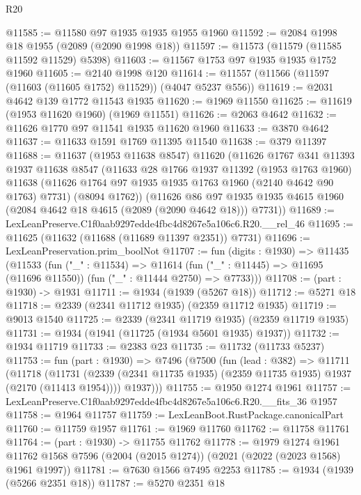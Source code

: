 \begin{lexlean}{R20}
\begin{coremodule}
@11585 := @11580 @97 @1935 @1935 @1955 @1960
@11592 := @2084 @1998 @18 @1955 (@2089 (@2090 @1998 @18))
@11597 := @11573 (@11579 (@11585 @11592 @11529) @5398)
@11603 := @11567 @1753 @97 @1935 @1935 @1752 @1960
@11605 := @2140 @1998 @120
@11614 := @11557 (@11566 (@11597 (@11603 (@11605 @1752) @11529)) (@4047 @5237 @556))
@11619 := @2031 @4642 @139 @1772 @11543 @1935
@11620 := @1969 @11550
@11625 := @11619 (@1953 @11620 @1960) (@1969 @11551)
@11626 := @2063 @4642
@11632 := @11626 @1770 @97 @11541 @1935 @11620 @1960
@11633 := @3870 @4642
@11637 := @11633 @1591 @1769 @11395 @11540
@11638 := @379 @11397
@11688 := @11637
    (@1953 @11638 @8547)
    @11620
    (@11626
      @1767
      @341
      @11393
      @1937
      @11638
      @8547
      (@11633
        @28
        @1766
        @1937
        @11392
        (@1953 @1763 @1960)
        @11638
        (@11626 @1764 @97 @1935 @1935 @1763 @1960 (@2140 @4642 @90 @1763) @7731)
        (@8094 @1762))
      (@11626
        @86
        @97
        @1935
        @1935
        @4615
        @1960
        (@2084 @4642 @18 @4615 (@2089 (@2090 @4642 @18)))
        @7731))
@11689 := LexLeanPreserve.C1f0aab9297edde4fbc4d8267e5a106c6.R20.__rel_46
@11695 := @11625 (@11632 (@11688 (@11689 @11397 @2351)) @7731)
@11696 := LexLeanPreservation.prim_boolNot
@11707 := fun (digits : @1930) =>
  @11435
    (@11533
      (fun ("_" : @11534) =>
      @11614 (fun ("_" : @11445) => @11695 (@11696 @11550)) (fun ("_" : @11444 @2750) => @7733)))
@11708 := (part : @1930) -> @1931
@11711 := @1934 (@1939 (@5267 @18))
@11712 := @5271 @18
@11718 := @2339 (@2341 @11712 @1935) (@2359 @11712 @1935)
@11719 := @9013 @1540
@11725 := @2339 (@2341 @11719 @1935) (@2359 @11719 @1935)
@11731 := @1934 (@1941 (@11725 (@1934 @5601 @1935) @1937))
@11732 := @1934 @11719
@11733 := @2383 @23
@11735 := @11732 (@11733 @5237)
@11753 := fun (part : @1930) =>
  @7496
    (@7500
      (fun (lead : @382) =>
      @11711
        (@11718
          (@11731 (@2339 (@2341 @11735 @1935) (@2359 @11735 @1935) @1937 (@2170 (@11413 @1954))))
          @1937)))
@11755 := @1950 @1274 @1961
@11757 := LexLeanPreserve.C1f0aab9297edde4fbc4d8267e5a106c6.R20.__fits_36 @1957
@11758 := @1964 @11757
@11759 := LexLeanBoot.RustPackage.canonicalPart
@11760 := @11759 @1957
@11761 := @1969 @11760
@11762 := @11758 @11761
@11764 := (part : @1930) -> @11755 @11762
@11778 := @1979
    @1274
    @1961
    @11762
    @1568
    @7596
    (@2004 (@2015 @1274))
    (@2021 (@2022 (@2023 @1568) @1961 @1997))
@11781 := @7630 @1566 @7495 @2253
@11785 := @1934 (@1939 (@5266 @2351 @18))
@11787 := @5270 @2351 @18

\end{coremodule}
\end{lexlean}
